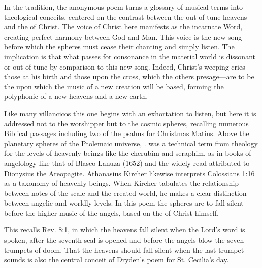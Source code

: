 In the  tradition, the anonymous poem turns a glossary of
musical terms into theological conceits, centered on the contrast between the
out-of-tune heavens and the  of Christ.
The voice of Christ here manifests as the incarnate Word, creating
perfect harmony between God and Man. 
This voice is the new song before which the spheres must cease their chanting
and simply listen.
The implication is that what passes for consonance in the material world is
dissonant or out of tune by comparison to this new song.
Indeed, Christ's weeping cries---those at his birth and those upon the cross,
which the others presage---are to be the  upon which the
music of a new creation will be based, forming the polyphonic 
of a new heavens and a new earth.%

Like many villancicos this one begins with an exhortation to listen, but here it
is addressed not to the worshipper but to the cosmic spheres, recalling numerous
Biblical passages including two of the psalms for Christmas Matins.%
    \citXXX[Ps. 18, 95; Dt. 32, Is. \XXX{}]
Above the planetary spheres of the Ptolemaic universe, . 
 was a technical term from theology for the levels of
heavenly beings like the cherubim and seraphim, as in books of angelology like
that of Blasco Lanuza (1652) and the widely read 
attributed to Dionysius the Areopagite.%
    \citXXX[diss p 242]
Athanasius Kircher likewise interprets Colossians 1:16 as a taxonomy of heavenly
beings.
When Kircher tabulates the relationship between notes of the scale and the
created world, he makes a clear distinction between angelic and worldly levels.
In this poem the spheres are to fall silent before the higher music of the
angels, based on the  of Christ himself.%
\begin{Footnote}
    This recalls Rev. 8:1, in which the heavens fall silent when the Lord's word
    is spoken, after the seventh seal is opened and before the angels blow the
    seven trumpets of doom.
    That the heavens should fall silent when the last trumpet sounds is also the
    central conceit of Dryden's poem for St. Cecilia's day. 
\end{Footnote}


